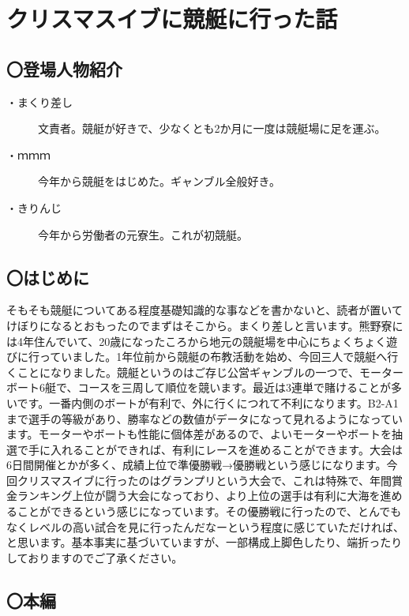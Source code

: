 \section{クリスマスイブに競艇に行った話}

\subsection{〇登場人物紹介}
\begin{description}
\item[・まくり差し]文責者。競艇が好きで、少なくとも2か月に一度は競艇場に足を運ぶ。
\item[・ｍｍｍ]今年から競艇をはじめた。ギャンブル全般好き。
\item[・きりんじ]今年から労働者の元寮生。これが初競艇。
\end{description}

\subsection{〇はじめに}

そもそも競艇についてある程度基礎知識的な事などを書かないと、読者が置いてけぼりになるとおもったのでまずはそこから。まくり差しと言います。熊野寮には4年住んでいて、20歳になったころから地元の競艇場を中心にちょくちょく遊びに行っていました。1年位前から競艇の布教活動を始め、今回三人で競艇へ行くことになりました。競艇というのはご存じ公営ギャンブルの一つで、モーターボート6艇で、コースを三周して順位を競います。最近は3連単で賭けることが多いです。一番内側のボートが有利で、外に行くにつれて不利になります。B2-A1まで選手の等級があり、勝率などの数値がデータになって見れるようになっています。モーターやボートも性能に個体差があるので、よいモーターやボートを抽選で手に入れることができれば、有利にレースを進めることができます。大会は6日間開催とかが多く、成績上位で準優勝戦→優勝戦という感じになります。今回クリスマスイブに行ったのはグランプリという大会で、これは特殊で、年間賞金ランキング上位が闘う大会になっており、より上位の選手は有利に大海を進めることができるという感じになっています。その優勝戦に行ったので、とんでもなくレベルの高い試合を見に行ったんだなーという程度に感じていただければ、と思います。基本事実に基づいていますが、一部構成上脚色したり、端折ったりしておりますのでご了承ください。

\subsection{〇本編}

